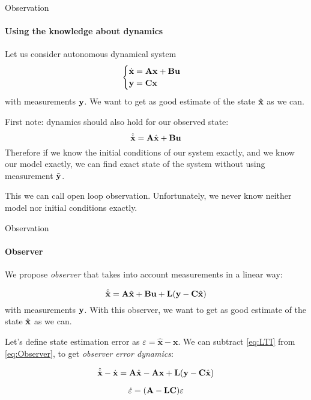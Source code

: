 \documentclass{beamer}
\begin{document}
\begin{frame}{Observation}
\framesubtitle{Using the knowledge about dynamics}
\begin{flushleft}

Let us consider autonomous dynamical system
\begin{equation}
\label{eq:LTI}
\begin{cases}
\dot {\mathbf{x}} = \mathbf{A} \mathbf{x} + \mathbf{B} \mathbf{u} \\
\mathbf{y} = \mathbf{C} \mathbf{x}
\end{cases}
\end{equation}
%
with measurements $\mathbf{y}$. We want to get as good estimate of the state $\hat{\mathbf{x}}$ as we can.

\bigskip

First note: dynamics should also hold for our observed state:
\begin{equation}
\hat{\dot {\mathbf{x}}} = \mathbf{A} \hat{\mathbf{x}} + \mathbf{B} \mathbf{u}
\end{equation}
%
Therefore if we know the initial conditions of our system exactly, and we know our model exactly, we can find exact state of the system without using measurement $\Tilde{\mathbf y}$. 

This we can call open loop observation. Unfortunately, we never know neither model nor initial conditions exactly.


\end{flushleft}
\end{frame}





\begin{frame}{Observation}
\framesubtitle{Observer}
\begin{flushleft}

We propose \emph{observer} that takes into account measurements in a linear way:

\begin{equation}
\label{eq:Observer}
\hat{\dot {\mathbf x}} = \mathbf A \hat{\mathbf x} + \mathbf B \mathbf u + \mathbf L(\mathbf y - \mathbf{C} \hat{\mathbf x})
\end{equation}
%
with measurements $\mathbf{y}$. With this observer, we want to get as good estimate of the state $\hat{\mathbf{x}}$ as we can.

\bigskip

Let's define state estimation error as $\varepsilon = \hat{\mathbf x} - \mathbf x$. We can subtract \eqref{eq:LTI} from \eqref{eq:Observer}, to get \emph{observer error dynamics}:

\begin{equation}
\hat{\dot {\mathbf x}} - \dot {\mathbf x}= 
\mathbf A \hat{\mathbf x} - \mathbf A \mathbf x + 
\mathbf L(\mathbf y - \mathbf{C} \hat{\mathbf x})
\end{equation}

\begin{equation}
\dot {\varepsilon}= 
(\mathbf A - \mathbf L \mathbf{C}) \varepsilon
\end{equation}

\end{flushleft}
\end{frame}
\end{document}
